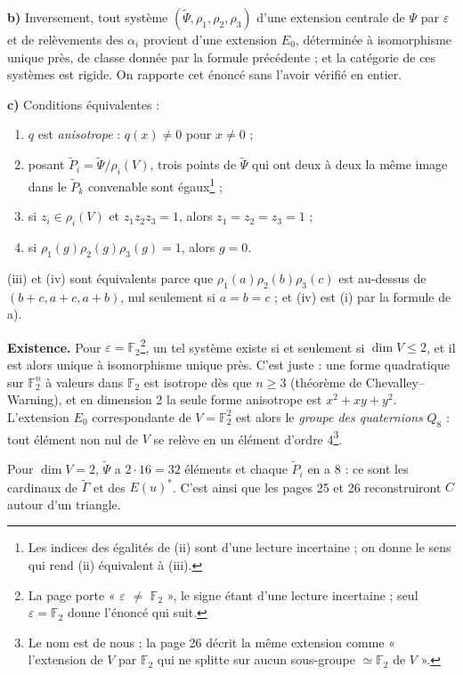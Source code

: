 \documentclass[11pt,a4paper]{article}
\begin{document}
\textbf{b)} Inversement, tout système $(\widetilde\Psi, \rho_1, \rho_2,
\rho_3)$ d'une extension centrale de $\Psi$ par $\varepsilon$ et de
relèvements des $\alpha_i$ provient d'une extension $E_0$, déterminée à
isomorphisme unique près, de classe donnée par la formule précédente ; et la
catégorie de ces systèmes est rigide. On rapporte cet énoncé sans l'avoir
vérifié en entier.

\textbf{c)} Conditions équivalentes :
\begin{enumerate}
\item[(i)] $q$ est \emph{anisotrope} : $q(x) \neq 0$ pour $x \neq 0$ ;
\item[(ii)] posant $\widetilde P_i = \widetilde\Psi/\rho_i(V)$, trois points
  de $\widetilde\Psi$ qui ont deux à deux la même image dans le
  $\widetilde P_k$ convenable sont égaux\footnote{Les indices des égalités de
  (ii) sont d'une lecture incertaine ; on donne le sens qui rend (ii)
  équivalent à (iii).} ;
\item[(iii)] si $z_i \in \rho_i(V)$ et $z_1 z_2 z_3 = 1$, alors $z_1 = z_2 =
  z_3 = 1$ ;
\item[(iv)] si $\rho_1(g) \rho_2(g) \rho_3(g) = 1$, alors $g = 0$.
\end{enumerate}
(iii) et (iv) sont équivalents parce que $\rho_1(a) \rho_2(b) \rho_3(c)$ est
au-dessus de $(b + c, a + c, a + b)$, nul seulement si $a = b = c$ ; et (iv)
est (i) par la formule de a).

\textbf{Existence.} Pour $\varepsilon = \mathbb{F}_2$\footnote{La page porte
« $\varepsilon$ $\neq$ $\mathbb{F}_2$ », le signe étant d'une lecture
incertaine ; seul $\varepsilon = \mathbb{F}_2$ donne l'énoncé qui suit.}, un
tel système existe si et seulement si $\dim V \leq 2$, et il est alors unique à
isomorphisme unique près. C'est juste : une forme quadratique sur
$\mathbb{F}_2^n$ à valeurs dans $\mathbb{F}_2$ est isotrope dès que $n \geq 3$
(théorème de Chevalley--Warning), et en dimension 2 la seule forme anisotrope
est $x^2 + xy + y^2$. L'extension $E_0$ correspondante de $V = \mathbb{F}_2^2$
est alors le \emph{groupe des quaternions} $Q_8$ : tout élément non nul de $V$
se relève en un élément d'ordre 4\footnote{Le nom est de nous ; la page 26
décrit la même extension comme « l'extension de $V$ par $\mathbb{F}_2$ qui ne
splitte sur aucun sous-groupe $\simeq \mathbb{F}_2$ de $V$ ».}.

Pour $\dim V = 2$, $\widetilde\Psi$ a $2 \cdot 16 = 32$ éléments et chaque
$\widetilde P_i$ en a 8 : ce sont les cardinaux de $\widetilde\Gamma$ et des
$E(u)^*$. C'est ainsi que les pages 25 et 26 reconstruiront $C$ autour d'un
triangle.
\end{document}
